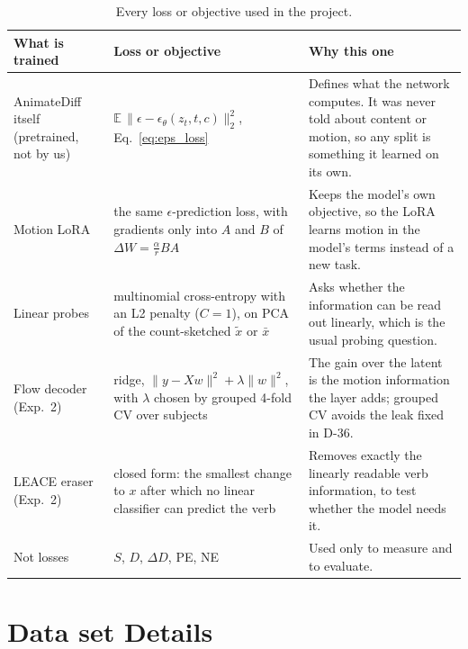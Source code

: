 \documentclass[twoside,english]{article}
\newcommand{\xs}{\bar{x}}         %
\newcommand{\xd}{\tilde{x}}       %
\newcommand{\dD}{\Delta D}
\begin{document}
\begin{table}[!h]
\centering
\small
\begin{tabular}{p{3.0cm}p{6.2cm}p{6.0cm}}
\toprule
What is trained & Loss or objective & Why this one \\
\midrule
AnimateDiff itself (pretrained, not by us) & $\mathbb{E}\,\|\epsilon - \epsilon_\theta(z_t,t,c)\|_2^2$, Eq.~\eqref{eq:eps_loss} &
  Defines what the network computes. It was never told about content or motion, so any split is something it learned on its own. \\
Motion LoRA & the same $\epsilon$-prediction loss, with gradients only into $A$ and $B$ of $\Delta W = \frac{\alpha}{r}BA$ &
  Keeps the model's own objective, so the LoRA learns motion in the model's terms instead of a new task. \\
Linear probes & multinomial cross-entropy with an L2 penalty ($C = 1$), on PCA of the count-sketched $\xd$ or $\xs$ &
  Asks whether the information can be read out linearly, which is the usual probing question. \\
Flow decoder (Exp.~2) & ridge, $\|y - Xw\|^2 + \lambda\|w\|^2$, with $\lambda$ chosen by grouped 4-fold CV over subjects &
  The gain over the latent is the motion information the layer adds; grouped CV avoids the leak fixed in D-36. \\
LEACE eraser (Exp.~2) & closed form: the smallest change to $x$ after which no linear classifier can predict the verb &
  Removes exactly the linearly readable verb information, to test whether the model needs it. \\
\midrule
Not losses & $S$, $D$, $\dD$, PE, NE & Used only to measure and to evaluate. \\
\bottomrule
\end{tabular}
\caption{Every loss or objective used in the project.}
\label{tab:losses}
\end{table}

\section{Data set Details} \label{sec:data}
\end{document}
